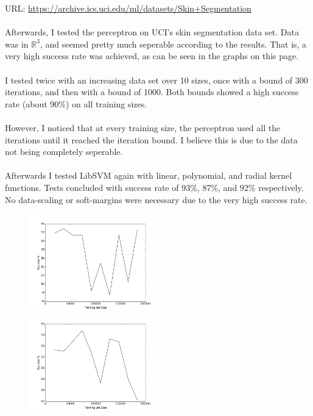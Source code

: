 \documentclass[a4paper]{article}
\begin{document}
URL: \url{https://archive.ics.uci.edu/ml/datasets/Skin+Segmentation}
\\\\
Afterwards, I tested the perceptron on UCI's skin segmentation data set.
Data was in $\mathbb{R}^3$, and seemed pretty much seperable according to the
results. That is, a very high success rate was achieved, as can be seen in the
graphs on this page.
\\\\
I tested twice with an increasing data set over 10 sizes,
once with a bound of 300 iterations, and then with a bound of 1000.
Both bounds showed a high success rate (about 90\%) on all training sizes.
\\\\
However, I noticed that at every training size,
the perceptron used all the iterations until it reached the iteration bound.
I believe this is due to the data not being completely seperable.
\\\\
Afterwards I tested LibSVM again with linear, polynomial, and radial kernel functions.
Tests concluded with success rate of 93\%, 87\%, and 92\% respectively.
No data-scaling or soft-margins were necessary due to the very high success rate.

\begin{figure}[h!]
    \includegraphics[width=0.5\textwidth]{images/300_iterations.png}
    \includegraphics[width=0.5\textwidth]{images/1000_iterations.png}
\end{figure}
\end{document}
